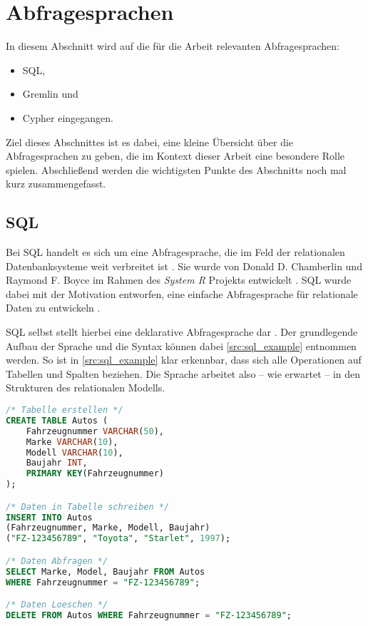 \section{Abfragesprachen}
In diesem Abschnitt wird auf die für die Arbeit relevanten Abfragesprachen:
\begin{itemize}
    \item SQL,
    \item Gremlin und
    \item Cypher eingegangen.
\end{itemize}
Ziel dieses Abschnittes ist es dabei, eine kleine Übersicht über die Abfragesprachen zu geben, die im Kontext dieser Arbeit eine besondere Rolle spielen. Abschließend werden die wichtigsten Punkte des Abschnitts noch mal kurz zusammengefasst.

\subsection{SQL}
Bei SQL handelt es sich um eine Abfragesprache, die im Feld der relationalen Datenbanksysteme weit verbreitet ist \cite{sql_history}. Sie wurde von Donald D. Chamberlin und Raymond F. Boyce im Rahmen des \textit{System R} Projekts entwickelt \cite{sql_history}. SQL wurde dabei mit der Motivation entworfen, eine einfache Abfragesprache für relationale Daten zu entwickeln \cite{sql_history}. 

SQL selbst stellt hierbei eine deklarative Abfragesprache dar \cite{sql_history}. Der grundlegende Aufbau der Sprache und die Syntax können dabei \autoref{src:sql_example} entnommen werden. So ist in \autoref{src:sql_example} klar erkennbar, dass sich alle Operationen auf Tabellen und Spalten beziehen. Die Sprache arbeitet also -- wie erwartet -- in den Strukturen des relationalen Modells.

\begin{lstlisting}[caption={Beispiel SQL-Queries},language=SQL,label=src:sql_example]
/* Tabelle erstellen */
CREATE TABLE Autos (
    Fahrzeugnummer VARCHAR(50), 
    Marke VARCHAR(10), 
    Modell VARCHAR(10), 
    Baujahr INT,
    PRIMARY KEY(Fahrzeugnummer)
);

/* Daten in Tabelle schreiben */
INSERT INTO Autos 
(Fahrzeugnummer, Marke, Modell, Baujahr) 
("FZ-123456789", "Toyota", "Starlet", 1997);

/* Daten Abfragen */
SELECT Marke, Model, Baujahr FROM Autos 
WHERE Fahrzeugnummer = "FZ-123456789";

/* Daten Loeschen */
DELETE FROM Autos WHERE Fahrzeugnummer = "FZ-123456789";
\end{lstlisting}

